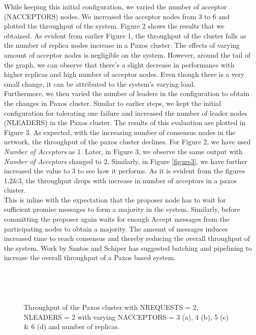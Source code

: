 \documentclass[conference, onecolumn]{IEEEtran}
\begin{document}
While keeping this initial configuration, we varied the number of acceptor (NACCEPTORS) nodes. 
We increased the acceptor nodes from 3 to 6 and plotted the throughput of the system. 
Figure 2 shows the results that we obtained. 
As evident from earlier Figure 1, the throughput of the cluster falls as the number of replica nodes increase in a Paxos cluster.
The effects of varying amount of acceptor nodes is negligible on the system. 
However, around the tail of the graph, we can observe that there's a slight decrease in performance with higher replicas and high number of acceptor nodes. 
Even though there is a very small change, it can be attributed to the system's varying load. 
\\

Furthermore, we then varied the number of leaders in the configuration to obtain the changes in Paxos cluster. 
Similar to earlier steps, we kept the initial configuration for tolerating one failure and increased the number of leader nodes (NLEADERS) in the Paxos cluster. 
The results of this evaluation are plotted in Figure 3. 
As expected, with the increasing number of consensus nodes in the network, the throughput of the paxos cluster declines. 
For Figure 2, we have used \textit{Number of Acceptors} as 1. 
Later, in Figure 3, we observe the same output with \textit{Number of Acceptors} changed to 2. 
Similarly, in Figure \ref{figure3}, we have further increased the value to 3 to see how it performs. 
As it is evident from the figures 1,2\&3, the throughput drops with increase in number of acceptors in a paxos cluster. 
\\
This is inline with the expectation that the proposer node has to wait for sufficient promise messages to form a majority in the system. 
Similarly, before committing the proposer again waits for enough Accept messages from the participating nodes to obtain a majority. 
The amount of messages induces increased time to reach consensus and thereby reducing the overall throughput of the system. 
Work by Santos and Schiper \cite{b2} has suggested batching and pipelining to increase the overall throughput of a Paxos based system. 
\begin{figure}[!ht]
	\begin{minipage}{\textwidth}
		\label{figure1}
		\centering
		\quad
		\\
		\quad
		\caption{Throughput of the Paxos cluster with NREQUESTS = 2, NLEADERS = 2 with varying NACCEPTORS = 3 (a), 4 (b), 5 (c) \& 6 (d) and number of replicas. }
	\end{minipage}\\[1em]
\end{figure}
\end{document}
